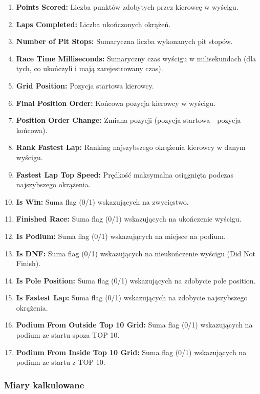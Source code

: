 \documentclass[a4paper,12pt]{article}
\begin{document}
\begin{enumerate}[label=\arabic*., wide, labelindent=0pt]
  \item \textbf{Points Scored:} Liczba punktów zdobytych przez kierowcę w wyścigu.
  \item \textbf{Laps Completed:} Liczba ukończonych okrążeń.
  \item \textbf{Number of Pit Stops:} Sumaryczna liczba wykonanych pit stopów.
  \item \textbf{Race Time Milliseconds:} Sumaryczny czas wyścigu w milisekundach (dla tych, co ukończyli i mają zarejestrowany czas).
  \item \textbf{Grid Position:} Pozycja startowa kierowcy.
  \item \textbf{Final Position Order:} Końcowa pozycja kierowcy w wyścigu.
  \item \textbf{Position Order Change:} Zmiana pozycji (pozycja startowa - pozycja końcowa).
  \item \textbf{Rank Fastest Lap:} Ranking najszybszego okrążenia kierowcy w danym wyścigu.
  \item \textbf{Fastest Lap Top Speed:} Prędkość maksymalna osiągnięta podczas najszybszego okrążenia.
  \item \textbf{Is Win:} Suma flag (0/1) wskazujących na zwycięstwo.
  \item \textbf{Finished Race:} Suma flag (0/1) wskazujących na ukończenie wyścigu.
  \item \textbf{Is Podium:} Suma flag (0/1) wskazujących na miejsce na podium.
  \item \textbf{Is DNF:} Suma flag (0/1) wskazujących na nieukończenie wyścigu (Did Not Finish).
  \item \textbf{Is Pole Position:} Suma flag (0/1) wskazujących na zdobycie pole position.
  \item \textbf{Is Fastest Lap:} Suma flag (0/1) wskazujących na zdobycie najszybszego okrążenia.
  \item \textbf{Podium From Outside Top 10 Grid:} Suma flag (0/1) wskazujących na podium ze startu spoza TOP 10.
  \item \textbf{Podium From Inside Top 10 Grid:} Suma flag (0/1) wskazujących na podium ze startu z TOP 10.
\end{enumerate}

\subsubsection*{Miary kalkulowane}
\end{document}
